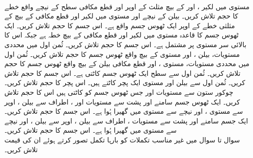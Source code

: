 \\
مستوی  میں لکیر ،  اور  کے بیچ مثلث کے اوپر  اور  قطع مکافی سطح   کے نیچے  واقع خطے کا حجم تلاش کریں۔
   بیلن   کے نیچے اور مستوی  میں لکیر  اور قطع مکافی   کے بیچ کے مثلثی  خطے کے اوپر   ایک ٹھوس جسم واقع ہے۔ اس جسم  کا حجم تلاش کریں۔
ایک ٹھوس جسم  کا قاعدہ مستوی  میں  لکیر  اور قطع مکافی  کے بیچ خطہ ہے جبکہ اس کا بالائی سر مستوی  پر مشتمل ہے۔  اس جسم کا حجم تلاش کریں۔
ثُمن  اول میں  محددی مستویات،  بیلن ،  اور مستوی  کے بیچ  واقع ٹھوس جسم کا حجم تلاش کریں۔ 
ثُمن اول میں  محددی مستویات، مستوی   ، اور قطع مکافی بیلن  کے بیچ  واقع ٹھوس جسم کا حجم تلاش کریں۔
ثُمن اول سے  سطح  ایک ٹھوس جسم کاٹتی ہے۔ اس جسم کا حجم تلاش کریں۔
ثُمن اول سے بیلن  اور مستوی   ایک  پچر کاٹتے ہیں۔ اس پچر کا حجم تلاش کریں۔
چوکور ستون    سے مستویات   اور   جس ٹھوس جسم کو کاٹتی ہیں اس کا حجم تلاش کریں۔
ایک ٹھوس جسم  سامنے اور پشت سے  مستویات  اور ،  اطراف سے بیلن ، اوپر سے مستوی ،  اور نیچے سے مستوی  میں گھیرا ہُوا ہے۔ اس جسم کا حجم تلاش کریں۔
ایک جسم سامنے اور پشت سے مستویات ، اطراف سے بیلن  ، اوپر سے بیلن ،  اور نیچے سے مستوی  میں گھیرا ہُوا ہے۔ اس جسم کا حجم تلاش کریں۔
\\
سوال  تا سوال  میں غیر مناسب تکملات کو بارہا تکمل تصور کرتے ہوئے ان  کی قیمت تلاش کریں۔

